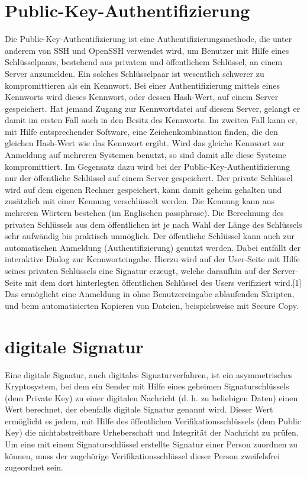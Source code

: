 \section{Public-Key-Authentifizierung}
Die Public-Key-Authentifizierung ist eine Authentifizierungsmethode, die unter anderem von SSH und OpenSSH verwendet wird, um Benutzer mit Hilfe eines Schlüsselpaars, bestehend aus privatem und öffentlichem Schlüssel, an einem Server anzumelden. Ein solches Schlüsselpaar ist wesentlich schwerer zu kompromittieren als ein Kennwort.
Bei einer Authentifizierung mittels eines Kennworts wird dieses Kennwort, oder dessen Hash-Wert, auf einem Server gespeichert. Hat jemand Zugang zur Kennwortdatei auf diesem Server, gelangt er damit im ersten Fall auch in den Besitz des Kennworts. Im zweiten Fall kann er, mit Hilfe entsprechender Software, eine Zeichenkombination finden, die den gleichen Hash-Wert wie das Kennwort ergibt. Wird das gleiche Kennwort zur Anmeldung auf mehreren Systemen benutzt, so sind damit alle diese Systeme kompromittiert.
Im Gegensatz dazu wird bei der Public-Key-Authentifizierung nur der öffentliche Schlüssel auf einem Server gespeichert. Der private Schlüssel wird auf dem eigenen Rechner gespeichert, kann damit geheim gehalten und zusätzlich mit einer Kennung verschlüsselt werden. Die Kennung kann aus mehreren Wörtern bestehen (im Englischen passphrase).
Die Berechnung des privaten Schlüssels aus dem öffentlichen ist je nach Wahl der Länge des Schlüssels sehr aufwändig bis praktisch unmöglich.
Der öffentliche Schlüssel kann auch zur automatischen Anmeldung (Authentifizierung) genutzt werden. Dabei entfällt der interaktive Dialog zur Kennworteingabe. Hierzu wird auf der User-Seite mit Hilfe seines privaten Schlüssels eine Signatur erzeugt, welche daraufhin auf der Server-Seite mit dem dort hinterlegten öffentlichen Schlüssel des Users verifiziert wird.[1] Das ermöglicht eine Anmeldung in ohne Benutzereingabe ablaufenden Skripten, und beim automatisierten Kopieren von Dateien, beispielsweise mit Secure Copy.
\section{digitale Signatur}
Eine digitale Signatur, auch digitales Signaturverfahren, ist ein asymmetrisches Kryptosystem, bei dem ein Sender mit Hilfe eines geheimen Signaturschlüssels (dem Private Key) zu einer digitalen Nachricht (d. h. zu beliebigen Daten) einen Wert berechnet, der ebenfalls digitale Signatur genannt wird. Dieser Wert ermöglicht es jedem, mit Hilfe des öffentlichen Verifikationsschlüssels (dem Public Key) die nichtabstreitbare Urheberschaft und Integrität der Nachricht zu prüfen. Um eine mit einem Signaturschlüssel erstellte Signatur einer Person zuordnen zu können, muss der zugehörige Verifikationsschlüssel dieser Person zweifelsfrei zugeordnet sein.
